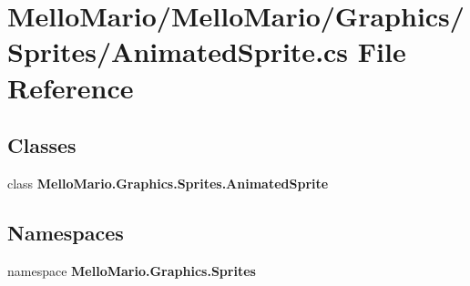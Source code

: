\section{Mello\+Mario/\+Mello\+Mario/\+Graphics/\+Sprites/\+Animated\+Sprite.cs File Reference}
\label{AnimatedSprite_8cs}
\subsection*{Classes}
\begin{DoxyCompactItemize}
\item 
class \textbf{ Mello\+Mario.\+Graphics.\+Sprites.\+Animated\+Sprite}
\end{DoxyCompactItemize}
\subsection*{Namespaces}
\begin{DoxyCompactItemize}
\item 
namespace \textbf{ Mello\+Mario.\+Graphics.\+Sprites}
\end{DoxyCompactItemize}
